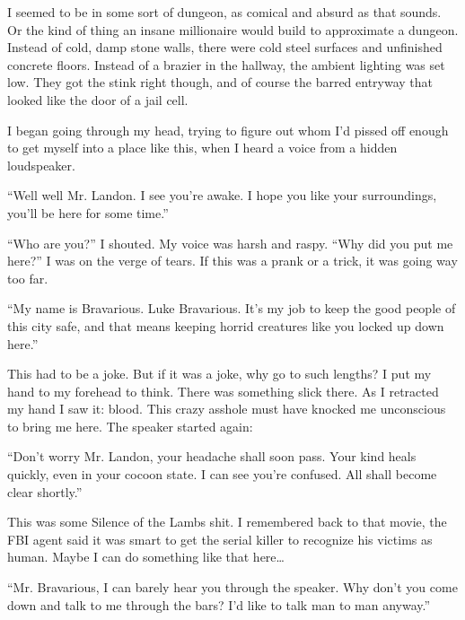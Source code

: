I seemed to be in some sort of dungeon, as comical and absurd as
that sounds. Or the kind of thing an insane millionaire would build
to approximate a dungeon. Instead of cold, damp stone walls, there
were cold steel surfaces and unfinished concrete floors. Instead of
a brazier in the hallway, the ambient lighting was set low. They
got the stink right though, and of course the barred entryway that
looked like the door of a jail cell.



I began going through my head, trying to figure out whom I'd
pissed off enough to get myself into a place like this, when I
heard a voice from a hidden loudspeaker.



``Well well Mr. Landon. I see you're awake. I hope you
like your surroundings, you'll be here for some
time.''



``Who are you?'' I shouted. My voice was harsh and raspy.
``Why did you put me here?'' I was on the verge of tears.
If this was a prank or a trick, it was going way too far.



``My name is Bravarious. Luke Bravarious. It's my job to
keep the good people of this city safe, and that means keeping
horrid creatures like you locked up down here.''



This had to be a joke. But if it was a joke, why go to such
lengths? I put my hand to my forehead to think. There was something
slick there. As I retracted my hand I saw it: blood. This crazy
asshole must have knocked me unconscious to bring me here. The
speaker started again:



``Don't worry Mr. Landon, your headache shall soon pass.
Your kind heals quickly, even in your cocoon state. I can see
you're confused. All shall become clear shortly.''



This was some Silence of the Lambs shit. I remembered back to that
movie, the FBI agent said it was smart to get the serial killer to
recognize his victims as human. Maybe I can do something like that
here{\ldots}



``Mr. Bravarious, I can barely hear you through the speaker.
Why don't you come down and talk to me through the bars?
I'd like to talk man to man anyway.''



